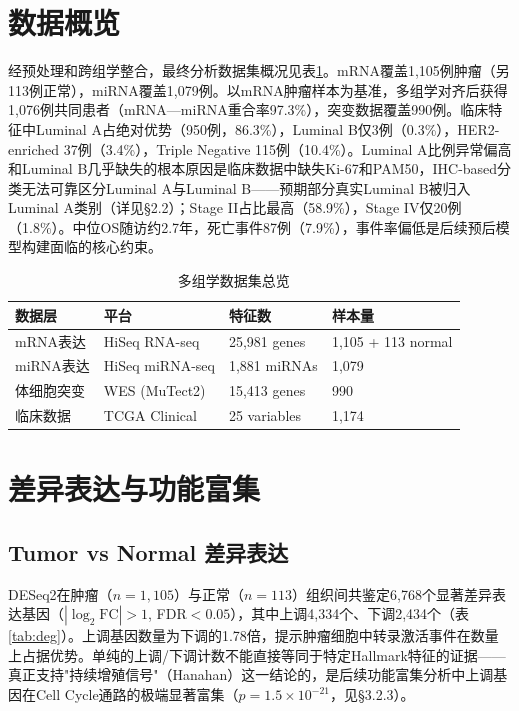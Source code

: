 \documentclass[12pt,a4paper,openany]{ctexbook}
\begin{document}
\section{数据概览}
经预处理和跨组学整合，最终分析数据集概况见表\ref{tab:data}。mRNA覆盖1,105例肿瘤（另113例正常），miRNA覆盖1,079例。以mRNA肿瘤样本为基准，多组学对齐后获得1,076例共同患者（mRNA—miRNA重合率97.3\%），突变数据覆盖990例。临床特征中Luminal A占绝对优势（950例，86.3\%），Luminal B仅3例（0.3\%），HER2-enriched 37例（3.4\%），Triple Negative 115例（10.4\%）。Luminal A比例异常偏高和Luminal B几乎缺失的根本原因是临床数据中缺失Ki-67和PAM50，IHC-based分类无法可靠区分Luminal A与Luminal B——预期部分真实Luminal B被归入Luminal A类别（详见§2.2）；Stage II占比最高（58.9\%），Stage IV仅20例（1.8\%）。中位OS随访约2.7年，死亡事件87例（7.9\%），事件率偏低是后续预后模型构建面临的核心约束。

\begin{table}[H]
\centering\caption{多组学数据集总览}\label{tab:data}
\begin{tabular}{llll}\toprule
数据层 & 平台 & 特征数 & 样本量 \\\midrule
mRNA表达 & HiSeq RNA-seq & 25,981 genes & 1,105 + 113 normal \\
miRNA表达 & HiSeq miRNA-seq & 1,881 miRNAs & 1,079 \\
体细胞突变 & WES (MuTect2) & 15,413 genes & 990 \\
临床数据 & TCGA Clinical & 25 variables & 1,174 \\\bottomrule
\end{tabular}
\end{table}

\section{差异表达与功能富集}

\subsection{Tumor vs Normal 差异表达}
DESeq2在肿瘤（$n=1,105$）与正常（$n=113$）组织间共鉴定6,768个显著差异表达基因（$|\log_2\text{FC}|>1$, FDR$<0.05$），其中上调4,334个、下调2,434个（表\ref{tab:deg}）。上调基因数量为下调的1.78倍，提示肿瘤细胞中转录激活事件在数量上占据优势。单纯的上调/下调计数不能直接等同于特定Hallmark特征的证据——真正支持"持续增殖信号"（Hanahan\cite{hanahan2011hallmarks}）这一结论的，是后续功能富集分析中上调基因在Cell Cycle通路的极端显著富集（$p=1.5\times10^{-21}$，见§3.2.3）。
\end{document}
